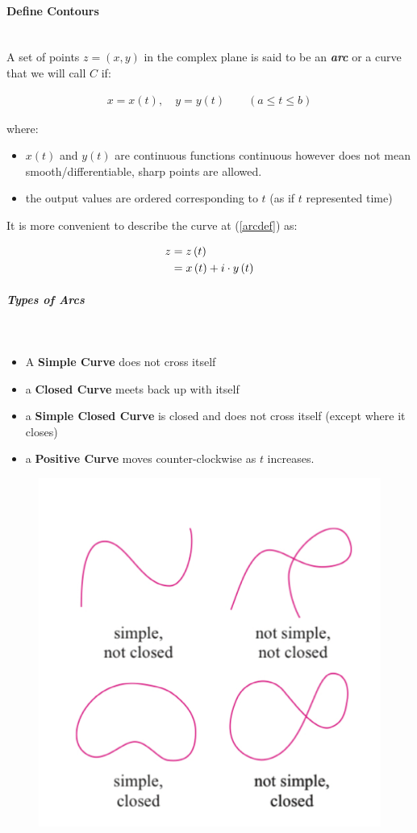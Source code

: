 \documentclass[class=article, crop=false]{standalone}
\begin{document}
\newpage


\paragraph{Define Contours}\ \\
A set of points $z =  \left( x,y \right)$ in the complex plane is said to be an \textbf{\textit{arc}} or a curve that we will call $C$ if:

\begin{align}
 x =  x\left( t \right), \quad y =  y\left( t \right) \qquad \left( a \leq t \leq b \right)
  \label{arcdef}
\end{align}

where:
\begin{itemize}
  \item $x\left( t \right)$ and $y\left( t \right) $ are continuous functions 
    \subitem continuous however does not mean smooth/differentiable, sharp points are allowed.
  \item the output values are ordered corresponding to $t$ (as if $t$ represented time)
\end{itemize}

It is more convenient to describe the curve at (\ref{arcdef}) as:

\begin{align}
  z &= z\left( t \right)  \label{arccompdef} \\
  &= x\left( t \right) + i\cdot y\left( t \right) \notag
\end{align}

\subparagraph{Types of Arcs}\ \\
\begin{itemize}
  \item A \textbf{Simple Curve} does not cross itself
  \item a \textbf{Closed Curve} meets back up with itself
  \item a \textbf{Simple Closed Curve} is closed and does not cross itself (except where it closes)
  \item a \textbf{Positive Curve} moves counter-clockwise as $t$ increases.
\end{itemize}
\begin{figure}[h!]
	
	\includegraphics[width=0.2\linewidth]{"./media/CompexIntegrals/Image.png"}

	\label{fig:image}
\end{figure}
\end{document}
